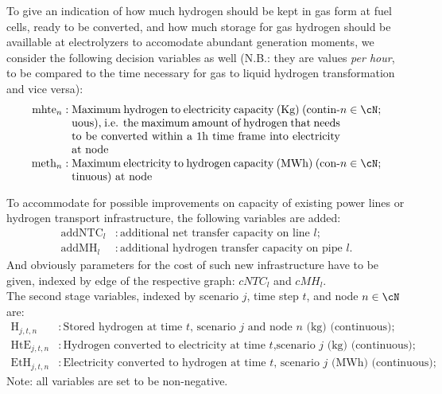 \documentclass[english]{article}
\numberwithin{definition}{section}
\numberwithin{theorem}{section}
\numberwithin{problem}{section}
\begin{document}
To give an indication of how much hydrogen should be kept in gas form at fuel cells, ready to be converted, and how much storage for gas hydrogen should be availlable at electrolyzers to accomodate abundant generation moments, we consider the following decision variables as well (N.B.: they are values \textit{per hour}, to be compared to the time necessary for gas to liquid hydrogen transformation and vice versa):
\begin{align*}
    \text{mhte}_n & : \parbox[t]{0.70\textwidth}{
    Maximum hydrogen to electricity capacity (Kg) (continuous), i.e. the maximum amount of hydrogen that needs to be converted within a 1h time frame into electricity at node} n \in \cN; \\
    \text{meth}_n & : \parbox[t]{0.70\textwidth}{Maximum electricity to hydrogen capacity (MWh) (continuous) at node} n \in \cN;
\end{align*}

To accommodate for possible improvements on capacity of existing power lines or hydrogen transport infrastructure, the following variables are added:
\begin{align*}
    \text{addNTC}_l & : \text{additional net transfer capacity on line $l$;}\\
    \text{addMH}_l & : \text{additional hydrogen transfer capacity on pipe $l$}.
\end{align*}
And obviously parameters for the cost of such new infrastructure have to be given, indexed by edge of the respective graph: $cNTC_l$ and $cMH_l$.\\


The second stage variables, indexed by scenario \(j\), time step \(t\), and node \(n \in \cN\) are:
\begin{align*}
    \text{H}_{j,t,n} & : \text{Stored hydrogen at time \(t\), scenario \(j\) and node \(n\) (kg) (continuous)};\\
    \text{HtE}_{j,t,n} & : \text{Hydrogen converted to electricity at time \(t\),scenario \(j\) (kg) (continuous);} \\
    \text{EtH}_{j,t,n} & : \text{Electricity converted to hydrogen at time \(t\), scenario \(j\) (MWh) (continuous);}
\end{align*}
Note: all variables are set to be non-negative.


\end{document}
